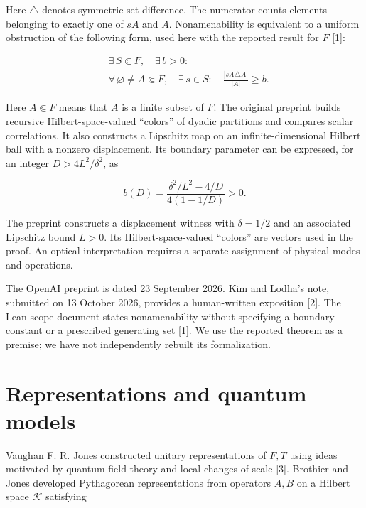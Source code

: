 \documentclass[11pt,a4paper]{article}
\begin{document}
Here \(\triangle\) denotes symmetric set difference. The numerator counts elements belonging to exactly one of \(sA\) and \(A\). Nonamenability is equivalent to a uniform obstruction of the following form, used here with the reported result for \(F\) {[}1{]}:

\begin{equation}\label{eq:4}
\begin{aligned}
&\exists\, S\Subset F,\quad \exists\, b>0:\\
&\forall\,\varnothing\ne A\Subset F,\quad
\exists\, s\in S:\quad
\frac{|sA\triangle A|}{|A|}\ge b.
\end{aligned}
\end{equation}

Here \(A\Subset F\) means that \(A\) is a finite subset of \(F\). The original preprint builds recursive Hilbert-space-valued ``colors'' of dyadic partitions and compares scalar correlations. It also constructs a Lipschitz map on an infinite-dimensional Hilbert ball with a nonzero displacement. Its boundary parameter can be expressed, for an integer \(D>4L^2/\delta^2\), as

\begin{equation}\label{eq:5}
b(D)=\frac{\delta^2/L^2-4/D}{4(1-1/D)}>0.
\end{equation}

The preprint constructs a displacement witness with \(\delta=1/2\) and an associated Lipschitz bound \(L>0\). Its Hilbert-space-valued ``colors'' are vectors used in the proof. An optical interpretation requires a separate assignment of physical modes and operations.

The OpenAI preprint is dated 23 September 2026. Kim and Lodha's note, submitted on 13 October 2026, provides a human-written exposition {[}2{]}. The Lean scope document states nonamenability without specifying a boundary constant or a prescribed generating set {[}1{]}. We use the reported theorem as a premise; we have not independently rebuilt its formalization.

\hypertarget{representations-and-quantum-models}{%
\section{Representations and quantum models}\label{representations-and-quantum-models}}

Vaughan F. R. Jones constructed unitary representations of \(F,T\) using ideas motivated by quantum-field theory and local changes of scale {[}3{]}. Brothier and Jones developed Pythagorean representations from operators \(A,B\) on a Hilbert space \(\mathcal K\) satisfying
\end{document}
